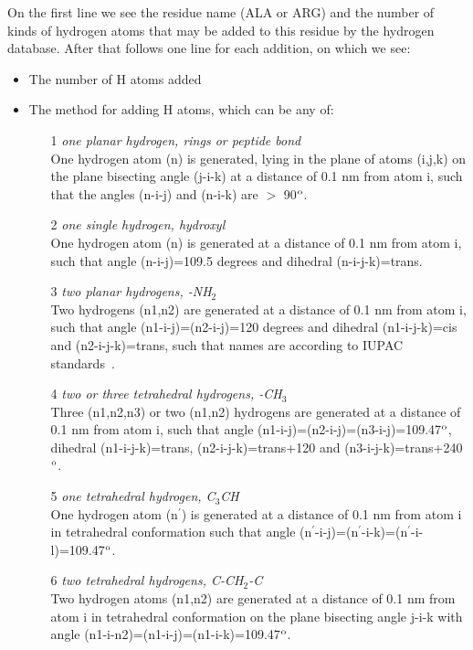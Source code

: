 On the first line we see the residue name (ALA or ARG) and the number
of kinds of hydrogen atoms that may be added to this residue by the
hydrogen database. After that follows one line for each addition, on which
we see:
\begin{itemize}
\item The number of H atoms added
\item The method for adding H atoms, which can be any of:
\begin{enumerate}
\item[1]{\em one planar hydrogen, {\eg} rings or peptide bond}\\
One hydrogen atom (n) is generated, lying in the plane of atoms
(i,j,k) on the plane bisecting angle (j-i-k) at a distance of 0.1 nm
from atom i, such that the angles (n-i-j) and (n-i-k) are $>$ 90$^{\rm o}$.

\item[2]{\em one single hydrogen, {\eg} hydroxyl}\\
One hydrogen atom (n) is generated at a distance of 0.1 nm from atom
i, such that angle (n-i-j)=109.5 degrees and dihedral (n-i-j-k)=trans.

\item[3]{\em two planar hydrogens, {\eg} -NH{$_2$}}\\
Two hydrogens (n1,n2) are generated at a distance of 0.1 nm from atom
i, such that angle (n1-i-j)=(n2-i-j)=120 degrees and dihedral
(n1-i-j-k)=cis and (n2-i-j-k)=trans, such that names are according to
IUPAC standards~\cite{iupac70}.

\item[4]{\em two or three tetrahedral hydrogens, {\eg} -CH{$_3$}}\\
Three (n1,n2,n3) or two (n1,n2) hydrogens are generated at a distance
of 0.1 nm from atom i, such that angle
(n1-i-j)=(n2-i-j)=(n3-i-j)=109.47$^{\rm o}$, dihedral (n1-i-j-k)=trans,
(n2-i-j-k)=trans+120 and (n3-i-j-k)=trans+240$^{\rm o}$.

\item[5]{\em one tetrahedral hydrogen, {\eg} C{$_3$}CH}\\
One hydrogen atom (n$^\prime$) is generated at a distance of 0.1 nm from atom
i in tetrahedral conformation such that angle
(n$^\prime$-i-j)=(n$^\prime$-i-k)=(n$^\prime$-i-l)=109.47$^{\rm o}$.

\item[6]{\em two tetrahedral hydrogens, {\eg} C-CH{$_2$}-C}\\
Two hydrogen atoms (n1,n2) are generated at a distance of 0.1 nm from
atom i in tetrahedral conformation on the plane bisecting angle j-i-k
with angle (n1-i-n2)=(n1-i-j)=(n1-i-k)=109.47$^{\rm o}$.


\end{enumerate}
\end{itemize}
